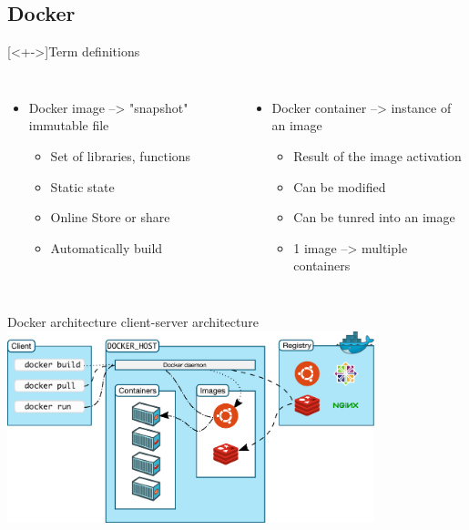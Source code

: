 \subsection{Docker}[<+->]{Term definitions}
\begin{frame}
\begin{columns}
\begin{itemize}
\item Docker image --> "snapshot" immutable file
	\begin{itemize}
	\item Set of libraries, functions
	\item Static state
	\item Online Store or share
	\item Automatically build
	\end{itemize}
\end{itemize}
\begin{itemize}
\item Docker container --> instance of an image
	\begin{itemize}
	\item Result of the image activation
	\item Can be modified
	\item Can be tunred into an image
	\item 1 image --> multiple containers 
	\end{itemize}
\end{itemize} 
\end{columns}
\end{frame}

\begin{frame}{Docker architecture}
client-server architecture \\
\centering\includegraphics[width=0.8\textwidth]{images/docker_arch_3.pdf}
\end{frame}

